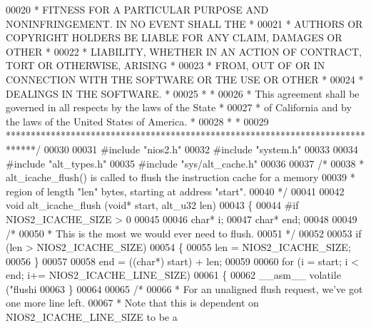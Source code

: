 \begin{DoxyCode}
00020 \textcolor{comment}{* FITNESS FOR A PARTICULAR PURPOSE AND NONINFRINGEMENT. IN NO EVENT SHALL THE *}
00021 \textcolor{comment}{* AUTHORS OR COPYRIGHT HOLDERS BE LIABLE FOR ANY CLAIM, DAMAGES OR OTHER      *}
00022 \textcolor{comment}{* LIABILITY, WHETHER IN AN ACTION OF CONTRACT, TORT OR OTHERWISE, ARISING     *}
00023 \textcolor{comment}{* FROM, OUT OF OR IN CONNECTION WITH THE SOFTWARE OR THE USE OR OTHER         *}
00024 \textcolor{comment}{* DEALINGS IN THE SOFTWARE.                                                   *}
00025 \textcolor{comment}{*                                                                             *}
00026 \textcolor{comment}{* This agreement shall be governed in all respects by the laws of the State   *}
00027 \textcolor{comment}{* of California and by the laws of the United States of America.              *}
00028 \textcolor{comment}{*                                                                             *}
00029 \textcolor{comment}{******************************************************************************/}
00030 
00031 \textcolor{preprocessor}{#include "nios2.h"}
00032 \textcolor{preprocessor}{#include "system.h"}
00033 
00034 \textcolor{preprocessor}{#include "alt_types.h"}
00035 \textcolor{preprocessor}{#include "sys/alt_cache.h"} 
00036 
00037 \textcolor{comment}{/*}
00038 \textcolor{comment}{ * alt\_icache\_flush() is called to flush the instruction cache for a memory}
00039 \textcolor{comment}{ * region of length "len" bytes, starting at address "start".}
00040 \textcolor{comment}{ */}
00041 
00042 \textcolor{keywordtype}{void} alt_icache_flush (\textcolor{keywordtype}{void}* start, alt_u32 len)
00043 \{
00044 \textcolor{preprocessor}{#if NIOS2\_ICACHE\_SIZE > 0}
00045 
00046   \textcolor{keywordtype}{char}* i;
00047   \textcolor{keywordtype}{char}* end;
00048 
00049   \textcolor{comment}{/*}
00050 \textcolor{comment}{   * This is the most we would ever need to flush.}
00051 \textcolor{comment}{   */}
00052  
00053   \textcolor{keywordflow}{if} (len > NIOS2_ICACHE_SIZE)
00054   \{
00055     len = NIOS2_ICACHE_SIZE;
00056   \}
00057 
00058   end = ((\textcolor{keywordtype}{char}*) start) + len;
00059 
00060   \textcolor{keywordflow}{for} (i = start; i < end; i+= NIOS2_ICACHE_LINE_SIZE)
00061   \{ 
00062     __asm__ \textcolor{keyword}{volatile} (\textcolor{stringliteral}{"flushi %
00063   \}
00064 
00065   \textcolor{comment}{/* }
00066 \textcolor{comment}{   * For an unaligned flush request, we've got one more line left.}
00067 \textcolor{comment}{   * Note that this is dependent on NIOS2\_ICACHE\_LINE\_SIZE to be a }
}
\end{DoxyCode}
